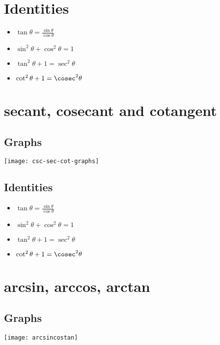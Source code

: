 \section{Identities}
\begin{itemize}
    \item $\tan \theta = \frac{\sin \theta}{\cos \theta}$
    \item $\sin^2 \theta + \cos^2 \theta = 1$
    \item $\tan^2 \theta + 1 = \sec^2 \theta$
    \item $\cot^2 \theta + 1 = \cosec^2 \theta$
\end{itemize}

\section{secant, cosecant and cotangent}
\subsection{Graphs}
\texttt{[image: csc-sec-cot-graphs]}

\subsection{Identities}
\begin{itemize}
    \item $\tan \theta = \frac{\sin \theta}{\cos \theta}$
    \item $\sin^2 \theta + \cos^2 \theta = 1$
    \item $\tan^2 \theta + 1 = \sec^2 \theta$
    \item $\cot^2 \theta + 1 = \cosec^2 \theta$
\end{itemize}

\section{arcsin, arccos, arctan}
\subsection{Graphs}
\texttt{[image: arcsincostan]}

